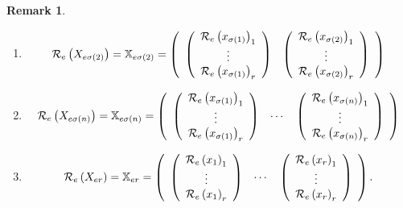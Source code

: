 \documentclass[aps,preprint]{revtex4}%
\newtheorem{remark}[theorem]{Remark}
\begin{document}
\begin{remark}
\begin{enumerate}
\item
\begin{equation}
\mathcal{R}_{e}\left(  X_{e\sigma\left(  2\right)  }\right)  =\mathbb{X}%
_{e\sigma\left(  2\right)  }=\left(
\begin{array}
[c]{cc}%
\left(
\begin{array}
[c]{c}%
\mathcal{R}_{e}\left(  x_{\sigma\left(  1\right)  }\right)  _{1}\\
\vdots\\
\mathcal{R}_{e}\left(  x_{\sigma\left(  1\right)  }\right)  _{r}%
\end{array}
\right)  & \left(
\begin{array}
[c]{c}%
\mathcal{R}_{e}\left(  x_{\sigma\left(  2\right)  }\right)  _{1}\\
\vdots\\
\mathcal{R}_{e}\left(  x_{\sigma\left(  2\right)  }\right)  _{r}%
\end{array}
\right)
\end{array}
\right)
\end{equation}


\item
\begin{equation}
\mathcal{R}_{e}\left(  X_{e\sigma\left(  n\right)  }\right)  =\mathbb{X}%
_{e\sigma\left(  n\right)  }=\left(
\begin{array}
[c]{ccc}%
\left(
\begin{array}
[c]{c}%
\mathcal{R}_{e}\left(  x_{\sigma\left(  1\right)  }\right)  _{1}\\
\vdots\\
\mathcal{R}_{e}\left(  x_{\sigma\left(  1\right)  }\right)  _{r}%
\end{array}
\right)  & \cdots & \left(
\begin{array}
[c]{c}%
\mathcal{R}_{e}\left(  x_{\sigma\left(  n\right)  }\right)  _{1}\\
\vdots\\
\mathcal{R}_{e}\left(  x_{\sigma\left(  n\right)  }\right)  _{r}%
\end{array}
\right)
\end{array}
\right)
\end{equation}


\item
\begin{equation}
\mathcal{R}_{e}\left(  X_{er}\right)  =\mathbb{X}_{er}=\left(
\begin{array}
[c]{ccc}%
\left(
\begin{array}
[c]{c}%
\mathcal{R}_{e}\left(  x_{1}\right)  _{1}\\
\vdots\\
\mathcal{R}_{e}\left(  x_{1}\right)  _{r}%
\end{array}
\right)  & \cdots & \left(
\begin{array}
[c]{c}%
\mathcal{R}_{e}\left(  x_{r}\right)  _{1}\\
\vdots\\
\mathcal{R}_{e}\left(  x_{r}\right)  _{r}%
\end{array}
\right)
\end{array}
\right)  .
\end{equation}


\end{enumerate}
\end{remark}
\end{document}
